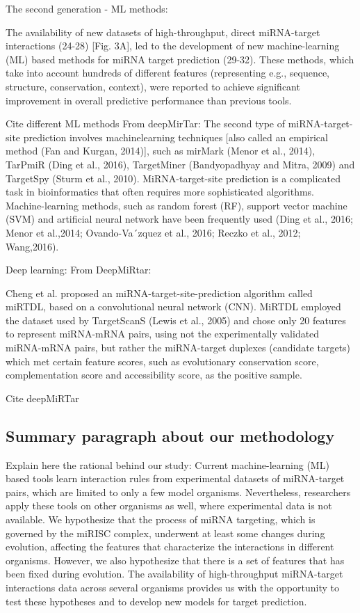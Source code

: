 \documentclass{bmcart}
\begin{document}
The second generation - ML methods:

The availability of new datasets of high-throughput, direct miRNA-target interactions (24-28) [Fig. 3A], led to the development of new machine-learning (ML) based methods for miRNA target prediction (29-32). These methods, which take into account hundreds of different features (representing e.g., sequence, structure, conservation, context), were reported to achieve significant improvement in overall predictive performance than previous tools. 

Cite different ML methods
From deepMirTar:
The second type of miRNA-target-site prediction involves machinelearning techniques [also called an empirical method (Fan and Kurgan, 2014)], such as mirMark (Menor et al., 2014), TarPmiR
(Ding et al., 2016), TargetMiner (Bandyopadhyay and Mitra, 2009)
and TargetSpy (Sturm et al., 2010). MiRNA-target-site prediction is a complicated task in bioinformatics that often requires more
sophisticated algorithms. Machine-learning methods, such as random forest (RF), support vector machine (SVM) and artificial neural network have been frequently used (Ding et al., 2016; Menor et al.,2014; Ovando-Va´zquez et al., 2016; Reczko et al., 2012; Wang,2016).

Deep learning:
From DeepMiRtar:

Cheng et al. proposed an miRNA-target-site-prediction algorithm called miRTDL, based on a convolutional neural network (CNN). MiRTDL employed the dataset used by TargetScanS (Lewis et al., 2005) and chose only 20 features to represent miRNA-mRNA pairs, using not the experimentally validated miRNA-mRNA pairs, but rather the miRNA-target duplexes (candidate targets) which met certain feature scores, such as evolutionary conservation score, complementation score and accessibility score, as the positive sample.

Cite deepMiRTar


\subsection*{Summary paragraph about our methodology}
Explain here the rational behind our study:
Current machine-learning (ML) based tools learn interaction rules from experimental datasets of miRNA-target pairs, which are limited to only a few model organisms. Nevertheless, researchers apply these tools on other organisms as well, where experimental data is not available. We hypothesize that the process of miRNA targeting, which is governed by the miRISC complex, underwent at least some changes during evolution, affecting the features that characterize the interactions in different organisms. However, we also hypothesize that there is a set of features that has been fixed during evolution. The availability of high-throughput miRNA-target interactions data across several organisms provides us with the opportunity to test these hypotheses and to develop new models for target prediction. 
\end{document}
